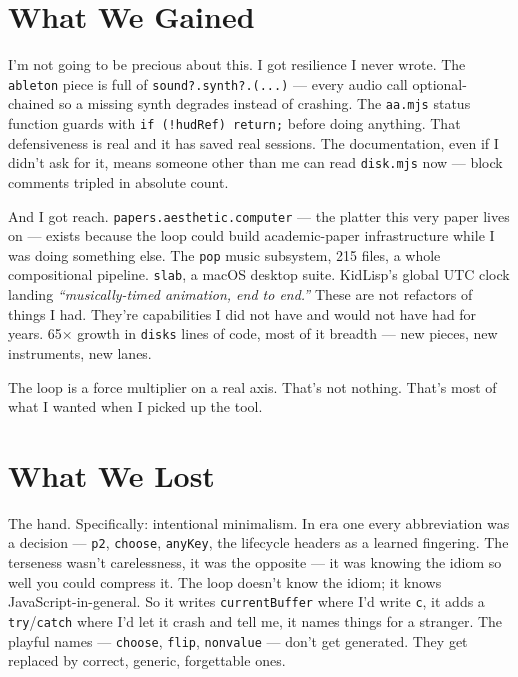 \documentclass[10pt,letterpaper,twocolumn]{article}
\begin{document}

\section{What We Gained}

I'm not going to be precious about this. I got resilience I never wrote. The \texttt{ableton} piece is full of \texttt{sound?.synth?.(...)} --- every audio call optional-chained so a missing synth degrades instead of crashing. The \texttt{aa.mjs} status function guards with \texttt{if (!hudRef) return;} before doing anything. That defensiveness is real and it has saved real sessions. The documentation, even if I didn't ask for it, means someone other than me can read \texttt{disk.mjs} now --- block comments tripled in absolute count.

And I got reach. \texttt{papers.aesthetic.computer} --- the platter this very paper lives on --- exists because the loop could build academic-paper infrastructure while I was doing something else. The \texttt{pop} music subsystem, 215 files, a whole compositional pipeline. \texttt{slab}, a macOS desktop suite. KidLisp's global UTC clock landing \emph{``musically-timed animation, end to end.''} These are not refactors of things I had. They're capabilities I did not have and would not have had for years. 65$\times$ growth in \texttt{disks} lines of code, most of it breadth --- new pieces, new instruments, new lanes.

The loop is a force multiplier on a real axis. That's not nothing. That's most of what I wanted when I picked up the tool.


\section{What We Lost}

The hand. Specifically: intentional minimalism. In era one every abbreviation was a decision --- \texttt{p2}, \texttt{choose}, \texttt{anyKey}, the lifecycle headers as a learned fingering. The terseness wasn't carelessness, it was the opposite --- it was knowing the idiom so well you could compress it. The loop doesn't know the idiom; it knows JavaScript-in-general. So it writes \texttt{currentBuffer} where I'd write \texttt{c}, it adds a \texttt{try}/\texttt{catch} where I'd let it crash and tell me, it names things for a stranger. The playful names --- \texttt{choose}, \texttt{flip}, \texttt{nonvalue} --- don't get generated. They get replaced by correct, generic, forgettable ones.
\end{document}
